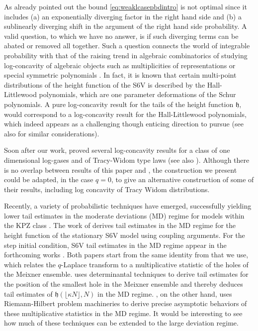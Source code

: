 \documentclass[reqno,11pt]{amsart}
\newcommand{\h}{\mathfrak{h}}
\numberwithin{equation}{section}
\theoremstyle{definition}
\begin{document}
As already pointed out the bound \eqref{eq:weaklcasepbdintro} is not optimal since it includes (a) an exponentially diverging factor in the right hand side and (b) a sublinearly diverging shift in the argument of the right hand side probability. A valid question, to which we have no answer, is if such diverging terms can be abated or removed all together. Such a question connects the world of integrable probability with that of the raising trend in algebraic combinatorics of studying log-concavity of algebraic objects such as multiplicities of representations or special symmetric polynomials \cite{Okounkov1997,Okounkov2003_why_would,huh_et_al_schur_log_concavity}. In fact, it is known \cite{BorodinBufetovWheeler2016} that certain multi-point distributions of the height function of the S6V is described by the Hall-Littlewood polynomials, which are one parameter deformations of the Schur polynomials. A pure log-concavity result for the tails of the height function $\mathfrak{h}$, would correspond to a log-concavity result for the Hall-Littlewood polynomials, which indeed appears as a challenging though enticing direction to pursue (see also \cite{BufetovGorinLogConcavity} for similar considerations).

Soon after our work, \cite{bkm24} proved several log-concavity results for a class of one dimensional log-gases and of Tracy-Widom type laws (see also \cite{bls17}). Although there is no overlap between results of this paper and \cite{bkm24}, the construction we present could be adapted, in the case $q=0$, to give an alternative construction of some of their results, including log concavity of Tracy Widom distributions.

{Recently, a variety of probabilistic techniques have emerged, successfully yielding lower tail estimates in the moderate deviations (MD) regime for models within the KPZ class \cite{aggarwal2023asep,ganguly_hegde2023optimal,ganguly2022sharp,landon2022tail,landon2023upper,corwin_hegde2022lower,landon2023tail,gs24,hindy24}. The work of \cite{landon2023tail} derives tail estimates in the MD regime for the height function of the stationary S6V model using coupling arguments. For the step initial condition, S6V tail estimates in the MD regime appear in the forthcoming works \cite{hindy24,gs24}. Both papers start from the same identity from \cite{BO2016_ASEP} that we use, which relates the $q$-Laplace transform to a multiplicative statistic of the holes of the Meixner ensemble. \cite{hindy24} uses determinantal techniques to derive tail estimates for the position of the smallest hole in the Meixner ensemble and thereby deduces tail estimates of $\h(\lfloor \kappa N\rfloor,N)$ in the MD regime. \cite{gs24}, on the other hand, uses Riemann-Hilbert problem machineries to derive precise asymptotic behaviors of these multiplicative statistics in the MD regime. It would be interesting to see how much of these techniques can be extended to the large deviation regime.}
\end{document}
